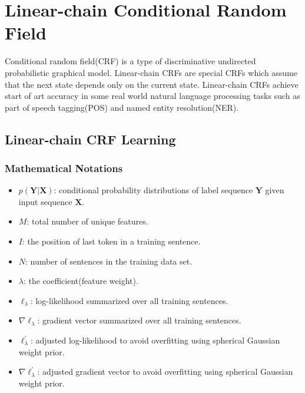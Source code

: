
\chapter[Linear-chain Conditional Random Field]{Linear-chain Conditional Random Field}
Conditional random field(CRF) \cite{DBLP:conf/icml/LaffertyMP01} is a type of discriminative undirected probabilistic graphical model.
Linear-chain CRFs are special CRFs which assume that the next state depends only on the current state.
Linear-chain CRFs achieve start of art accuracy in some real world natural language processing tasks such
as part of speech tagging(POS) and named entity resolution(NER).

\section{Linear-chain CRF Learning}

\subsection{Mathematical Notations}
\begin{itemize}
\item $p(\boldsymbol Y | \boldsymbol X)$: conditional probability distributions of label sequence $\boldsymbol Y$ given input sequence $\boldsymbol X$.
\item $M$: total number of unique features.
\item $I$: the position of last token in a training sentence.
\item $N$: number of sentences in the training data set.
\item $\lambda$: the coefficient(feature weight).
\item $\ell_{\lambda}$: log-likelihood summarized over all training sentences.
\item $\nabla \ell_{\lambda}$: gradient vector summarized over all training sentences.
\item $\ell_{\lambda}^\prime$: adjusted log-likelihood to avoid overfitting using spherical Gaussian weight prior.
\item $\nabla \ell_{\lambda}^\prime$: adjusted gradient vector to avoid overfitting using spherical Gaussian weight prior.

\end{itemize}

